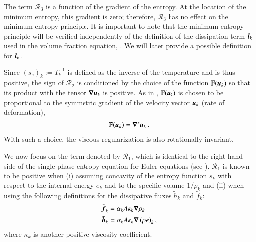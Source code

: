 The term ${\mathcal{R}_3}$ is a function of the gradient of the entropy.  
At the location of the minimum entropy, this gradient is zero; therefore, $\mathcal{R}_3$ 
has no effect on the minimum entropy principle. It is important to note that the minimum entropy principle will be verified
independently of the definition of the dissipation term $\boldsymbol l_k$ used in the volume fraction
equation, . We will later provide a possible definition for $\boldsymbol l_k$.

Since $(s_e)_k:=T_k^{-1}$ is defined as the inverse of the temperature and is thus positive, the sign of $\mathcal{R}_2$ is 
conditioned by the choice of the function $\mathbb{F}(\boldsymbol u_k)$ so that its product with the tensor $\boldsymbol\nabla \boldsymbol u_k$ is 
positive. As in \cite{jlg,Marco_paper_low_mach}, $\mathbb{F}(\boldsymbol u_k)$ is chosen to be proportional to the symmetric 
gradient of the velocity vector $\boldsymbol u_k$ (rate of deformation),
\begin{equation}
\mathbb{F}(\boldsymbol u_k) = \boldsymbol\nabla^s \boldsymbol u_k \,.
\end{equation}
With such a choice, the viscous regularization is also rotationally invariant.

We now focus on the term denoted by $\mathcal{R}_1$, which is identical to the right-hand side of the single phase entropy 
equation for Euler equations (see \cite{jlg,Marco_paper_low_mach}). $\mathcal{R}_1$ is known to be positive when 
(i) assuming concavity of the entropy function $s_k$ with respect to the internal energy $e_k$ and to the specific 
volume $1 / \rho_k$ and (ii) when using the following definitions for the dissipative fluxes $\tilde{h}_k$ and $\tilde{f}_k$:
%
\begin{subequations} \label{eq:def_visc}
\begin{align}
&\tilde{\boldsymbol f}_k = \alpha_k A \kappa_k \boldsymbol\nabla \rho_k \\
&\tilde{\boldsymbol h}_k = \alpha_k A \kappa_k \boldsymbol\nabla \left( \rho e \right)_k,
\end{align}
\end{subequations}
%  
where $\kappa_k$ is another positive viscosity coefficient. 


